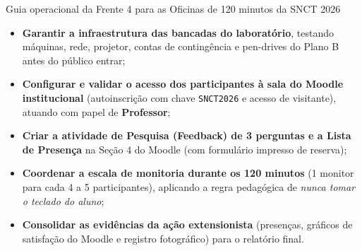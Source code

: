   {Guia operacional da Frente 4 para as Oficinas de 120 minutos da SNCT 2026}
  {\hspace{4pt}
   \hspace{4pt}
   }

\vspace{0.4em}

\begin{boxObjetivos}
\begin{itemize}
  \item \textbf{Garantir a infraestrutura das bancadas do laboratório}, testando máquinas, rede, projetor, contas de contingência e pen-drives do Plano B antes do público entrar;
  \item \textbf{Configurar e validar o acesso dos participantes à sala do Moodle institucional} (autoinscrição com chave \texttt{SNCT2026} e acesso de visitante), atuando com papel de \textbf{Professor};
  \item \textbf{Criar a atividade de Pesquisa (Feedback) de 3 perguntas e a Lista de Presença} na Seção 4 do Moodle (com formulário impresso de reserva);
  \item \textbf{Coordenar a escala de monitoria durante os 120 minutos} (1 monitor para cada 4 a 5 participantes), aplicando a regra pedagógica de \emph{nunca tomar o teclado do aluno};
  \item \textbf{Consolidar as evidências da ação extensionista} (presenças, gráficos de satisfação do Moodle e registro fotográfico) para o relatório final.
\end{itemize}
\end{boxObjetivos}

\begin{mapaAula}
\end{mapaAula}

